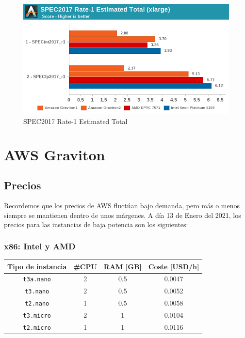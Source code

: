 \documentclass[a4paper,openright,12pt]{article}
\begin{document}
\begin{figure}[h]
\includegraphics[width=\textwidth]{img/graviton_vs_amd_vs_intel_spec_total.png}
\caption{SPEC2017 Rate-1 Estimated Total}
\label{fig:graviton_vs_amd_vs_intel_spec_total}
\end{figure}


\newpage
\section{AWS Graviton}
\subsection{Precios}
Recordemos que los precios de AWS fluctúan bajo demanda, pero más o menos siempre se mantienen dentro de unos márgenes.
A día 13 de Enero del 2021, los precios para las instancias de baja potencia son los siguientes:
\subsubsection{x86: Intel y AMD}
\begin{center}
\begin{tabular}{ | c | c | c | c | }
    \hline
    Tipo de instancia       &   \#CPU   &   RAM [GB]    &   Coste [USD/h]   \\
    \hline
    \texttt{t3a.nano}       &   2       &   0.5         &   0.0047          \\
    \hline
    \texttt{t3.nano}        &   2       &   0.5         &   0.0052          \\
    \hline
    \texttt{t2.nano}        &   1       &   0.5         &   0.0058          \\
    \hline
    \texttt{t3.micro}       &   2       &   1           &   0.0104          \\
    \hline
    \texttt{t2.micro}       &   1       &   1           &   0.0116          \\
    \hline
\end{tabular}
\end{center}
\end{document}
